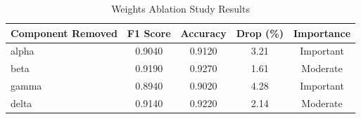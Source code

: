 \begin{table}[htbp]
\centering
\caption{Weights Ablation Study Results}
\label{tab:ablation_weights}
\begin{tabular}{lcccc}
\toprule
Component Removed & F1 Score & Accuracy & Drop (\%) & Importance \\
\midrule
alpha & 0.9040 & 0.9120 & 3.21 & Important \\
beta & 0.9190 & 0.9270 & 1.61 & Moderate \\
gamma & 0.8940 & 0.9020 & 4.28 & Important \\
delta & 0.9140 & 0.9220 & 2.14 & Moderate \\
\bottomrule
\end{tabular}
\end{table}